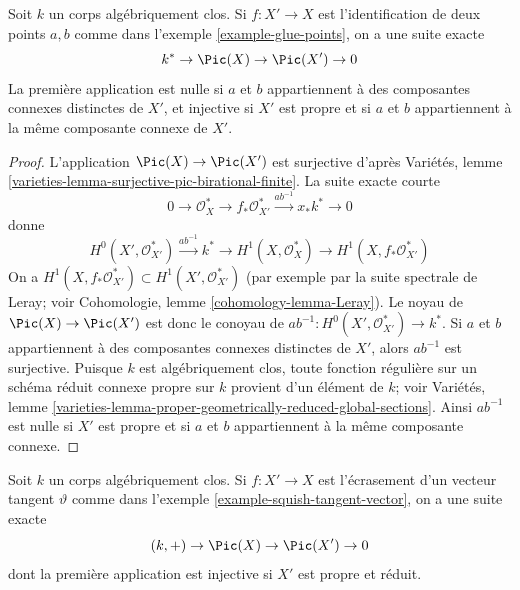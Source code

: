 \begin{lemma}
\label{lemma-glue-points}
Soit $k$ un corps algébriquement clos. Si $f : X' \to X$ est l'identification de deux points $a, b$ comme dans l'exemple \ref{example-glue-points}, on a une suite exacte $$
k^* \to \Pic(X) \to \Pic(X') \to 0
$$ La première application est nulle si $a$ et $b$ appartiennent à des composantes connexes distinctes de $X'$, et injective si $X'$ est propre et si $a$ et $b$ appartiennent à la même composante connexe de $X'$.
\end{lemma}

\begin{proof}
L'application $\Pic(X) \to \Pic(X')$ est surjective d'après Variétés, lemme \ref{varieties-lemma-surjective-pic-birational-finite}. La suite exacte courte $$
0 \to \mathcal{O}_X^* \to f_*\mathcal{O}_{X'}^*
\xrightarrow{ab^{-1}} x_*k^* \to 0
$$ donne $$
H^0(X', \mathcal{O}_{X'}^*) \xrightarrow{ab^{-1}} k^* \to
H^1(X, \mathcal{O}_X^*) \to H^1(X, f_*\mathcal{O}_{X'}^*)
$$ On a $H^1(X, f_*\mathcal{O}_{X'}^*) \subset H^1(X', \mathcal{O}_{X'}^*)$ (par exemple par la suite spectrale de Leray; voir Cohomologie, lemme \ref{cohomology-lemma-Leray}). Le noyau de $\Pic(X) \to \Pic(X')$ est donc le conoyau de $ab^{-1} : H^0(X', \mathcal{O}_{X'}^*) \to k^*$. Si $a$ et $b$ appartiennent à des composantes connexes distinctes de $X'$, alors $ab^{-1}$ est surjective. Puisque $k$ est algébriquement clos, toute fonction régulière sur un schéma réduit connexe propre sur $k$ provient d'un élément de $k$; voir Variétés, lemme \ref{varieties-lemma-proper-geometrically-reduced-global-sections}. Ainsi $ab^{-1}$ est nulle si $X'$ est propre et si $a$ et $b$ appartiennent à la même composante connexe.
\end{proof}

\begin{lemma}
\label{lemma-squish-tangent-vector}
Soit $k$ un corps algébriquement clos. Si $f : X' \to X$ est l'écrasement d'un vecteur tangent $\vartheta$ comme dans l'exemple \ref{example-squish-tangent-vector}, on a une suite exacte $$
(k, +) \to \Pic(X) \to \Pic(X') \to 0
$$ dont la première application est injective si $X'$ est propre et réduit.
\end{lemma}

